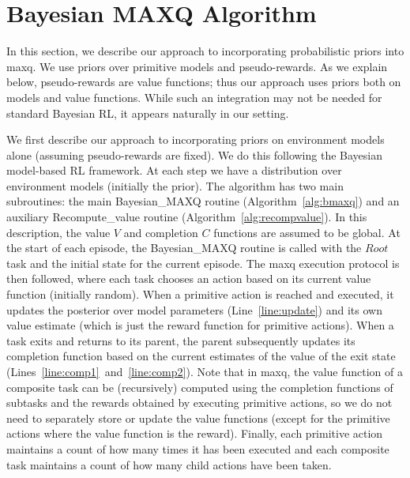 \section{Bayesian {\sc MAXQ} Algorithm}
\label{sec:algo}

In this section, we describe our approach to incorporating
probabilistic priors into {\sc maxq}. We use priors over 
primitive models and pseudo-rewards. As we explain below,
pseudo-rewards are value functions; thus our approach
uses priors both on models and value functions. While such an
integration may not be needed for standard Bayesian RL, it appears
naturally in our setting.

We first describe our approach to incorporating priors on environment
models alone (assuming pseudo-rewards are fixed). We do this following
the Bayesian model-based RL framework. At each step we have a
distribution over environment models (initially the prior). The
algorithm has two main subroutines: the main {\sc Bayesian\_MAXQ}
routine (Algorithm~\ref{alg:bmaxq}) and an auxiliary {\sc
Recompute\_value} routine (Algorithm~\ref{alg:recompvalue}). In this
description, the value $V$ and completion $C$ functions are assumed to
be global.
At the start of each episode, the {\sc Bayesian\_MAXQ} routine is
called with the $Root$ task and the initial state for the current
episode. The {\sc maxq} execution protocol is then followed, where
each task chooses an action based on its current value function
(initially random). When a primitive action is reached and executed,
it updates the posterior over model parameters
(Line~\ref{line:update}) and its own value estimate (which is just the
reward function for primitive actions). When a task exits and returns
to its parent, the parent subsequently updates its completion function
based on the current estimates of the value of the exit state
(Lines~\ref{line:comp1}~and~\ref{line:comp2}). Note that in {\sc
  maxq}, the value function of a composite task can be (recursively)
computed using the completion functions of subtasks and the rewards
obtained by executing primitive actions, so we do not need to
separately store or update the value functions (except for the
primitive actions where the value function is the reward). Finally,
each primitive action maintains a count of how many times it has been
executed and each composite task maintains a count of how many child
actions have been taken.

